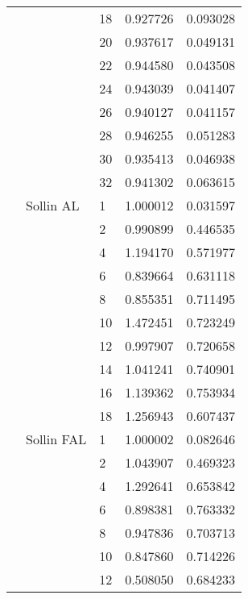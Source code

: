 \begin{tabular}{lllrr}
                      &            & 18 &  0.927726 &  0.093028 \\
                      &            & 20 &  0.937617 &  0.049131 \\
                      &            & 22 &  0.944580 &  0.043508 \\
                      &            & 24 &  0.943039 &  0.041407 \\
                      &            & 26 &  0.940127 &  0.041157 \\
                      &            & 28 &  0.946255 &  0.051283 \\
                      &            & 30 &  0.935413 &  0.046938 \\
                      &            & 32 &  0.941302 &  0.063615 \\
                      & Sollin AL & 1  &  1.000012 &  0.031597 \\
                      &            & 2  &  0.990899 &  0.446535 \\
                      &            & 4  &  1.194170 &  0.571977 \\
                      &            & 6  &  0.839664 &  0.631118 \\
                      &            & 8  &  0.855351 &  0.711495 \\
                      &            & 10 &  1.472451 &  0.723249 \\
                      &            & 12 &  0.997907 &  0.720658 \\
                      &            & 14 &  1.041241 &  0.740901 \\
                      &            & 16 &  1.139362 &  0.753934 \\
                      &            & 18 &  1.256943 &  0.607437 \\
                      & Sollin FAL & 1  &  1.000002 &  0.082646 \\
                      &            & 2  &  1.043907 &  0.469323 \\
                      &            & 4  &  1.292641 &  0.653842 \\
                      &            & 6  &  0.898381 &  0.763332 \\
                      &            & 8  &  0.947836 &  0.703713 \\
                      &            & 10 &  0.847860 &  0.714226 \\
                      &            & 12 &  0.508050 &  0.684233 \\

\end{tabular}
